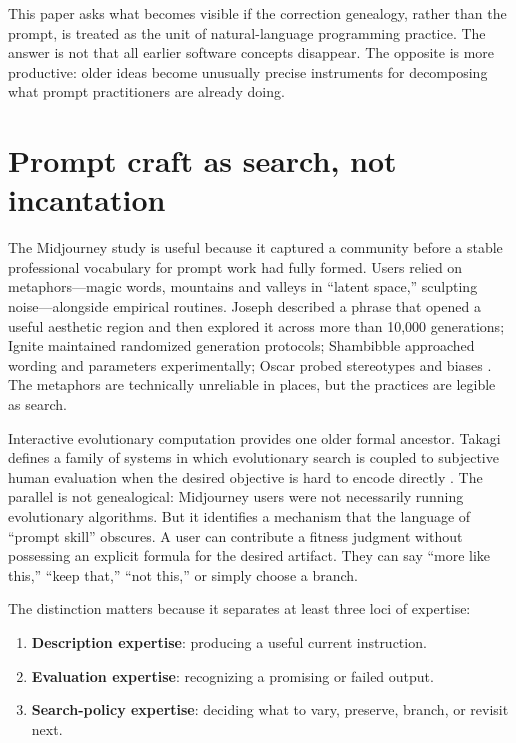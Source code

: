 \documentclass[11pt]{article}
\begin{document}
This paper asks what becomes visible if the correction genealogy, rather than the prompt, is treated as the unit of natural-language programming practice. The answer is not that all earlier software concepts disappear. The opposite is more productive: older ideas become unusually precise instruments for decomposing what prompt practitioners are already doing.

\section{Prompt craft as search, not incantation}

The Midjourney study is useful because it captured a community before a stable professional vocabulary for prompt work had fully formed. Users relied on metaphors---magic words, mountains and valleys in ``latent space,'' sculpting noise---alongside empirical routines. Joseph described a phrase that opened a useful aesthetic region and then explored it across more than 10,000 generations; Ignite maintained randomized generation protocols; Shambibble approached wording and parameters experimentally; Oscar probed stereotypes and biases \cite{sun_hartsoe_ottolin2022_sculptors}. The metaphors are technically unreliable in places, but the practices are legible as search.

Interactive evolutionary computation provides one older formal ancestor. Takagi defines a family of systems in which evolutionary search is coupled to subjective human evaluation when the desired objective is hard to encode directly \cite{takagi2001interactive}. The parallel is not genealogical: Midjourney users were not necessarily running evolutionary algorithms. But it identifies a mechanism that the language of ``prompt skill'' obscures. A user can contribute a fitness judgment without possessing an explicit formula for the desired artifact. They can say ``more like this,'' ``keep that,'' ``not this,'' or simply choose a branch.

The distinction matters because it separates at least three loci of expertise:

\begin{enumerate}
  \item \textbf{Description expertise}: producing a useful current instruction.
  \item \textbf{Evaluation expertise}: recognizing a promising or failed output.
  \item \textbf{Search-policy expertise}: deciding what to vary, preserve, branch, or revisit next.
\end{enumerate}
\end{document}
